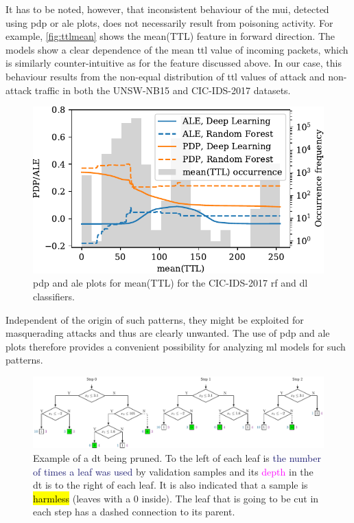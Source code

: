 \documentclass[10pt,sigconf,letterpaper,dvipsnames]{acmart}
\newcommand{\unsw}{UNSW-NB15}
\begin{document}
It has to be noted, however, that inconsistent behaviour of the \gls{mui}, detected using \gls{pdp} or \gls{ale} plots, does not necessarily result from poisoning activity.  For example, \autoref{fig:ttlmean} shows the mean(TTL) feature in forward direction. The models show a clear dependence of the mean \gls{ttl} value of incoming packets, which is similarly counter-intuitive as for the feature discussed above. In our case, this behaviour results from the non-equal distribution of \gls{ttl} values of attack and non-attack traffic in both the \unsw{} and CIC-IDS-2017 datasets.

\begin{figure}[b]
\includegraphics[width=\columnwidth]{figures/ttlmean.pdf}
\caption{\gls{pdp} and \gls{ale} plots for mean(TTL) for the CIC-IDS-2017 \gls{rf} and \gls{dl} classifiers.}
\label{fig:ttlmean}
\end{figure}
Independent of the origin of such patterns, they might be exploited for masquerading attacks and thus are clearly unwanted. The use of \gls{pdp} and \gls{ale} plots therefore provides a convenient possibility for analyzing \gls{ml} models for such patterns.

\begin{figure}[h]
\includegraphics[width=\textwidth]{pruning_example.pdf}
\caption{Example of a \gls{dt} being pruned. To the left of each leaf is \textcolor{MidnightBlue}{the number of times a leaf was used} by validation samples and its \textcolor{Fuchsia}{depth} in the \gls{dt} is to the right of each leaf. It is also indicated that a sample is \protect{} \hl{harmless} (leaves with a 0 inside). The leaf that is going to be cut in each step has a dashed connection to its parent.}
\label{fig:pruningExample}
\end{figure}
\end{document}
